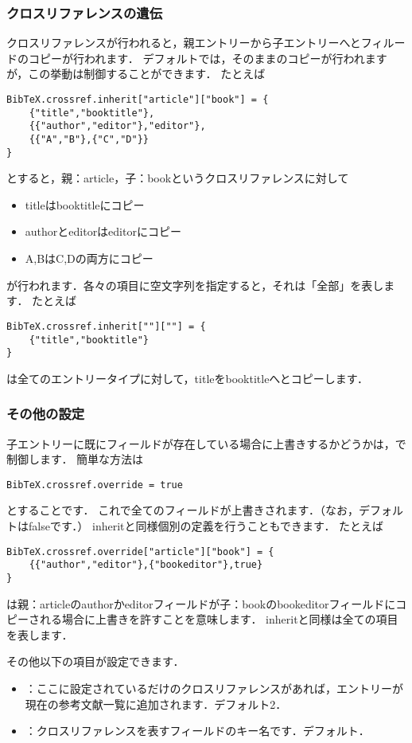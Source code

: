 \documentclass[a4paper]{ltjsarticle}
\begin{document}
\subsubsection{クロスリファレンスの遺伝}
クロスリファレンスが行われると，親エントリーから子エントリーへとフィルードのコピーが行われます．
デフォルトでは，そのままのコピーが行われますが，この挙動は制御することができます．
たとえば
\begin{lstlisting}
BibTeX.crossref.inherit["article"]["book"] = {
    {"title","booktitle"},
    {{"author","editor"},"editor"},
    {{"A","B"},{"C","D"}}
}
\end{lstlisting}
とすると，親：article，子：bookというクロスリファレンスに対して
\begin{itemize}
\item titleはbooktitleにコピー
\item authorとeditorはeditorにコピー
\item A,BはC,Dの両方にコピー
\end{itemize}
が行われます．各々の項目に空文字列\luastring{}を指定すると，それは「全部」を表します．
たとえば
\begin{lstlisting}
BibTeX.crossref.inherit[""][""] = {
    {"title","booktitle"}
}
\end{lstlisting}
は全てのエントリータイプに対して，titleをbooktitleへとコピーします．

\subsubsection{その他の設定}
子エントリーに既にフィールドが存在している場合に上書きするかどうかは，で制御します．
簡単な方法は
\begin{lstlisting}
BibTeX.crossref.override = true
\end{lstlisting}
とすることです．
これで全てのフィールドが上書きされます．（なお，デフォルトはfalseです．）
inheritと同様個別の定義を行うこともできます．
たとえば
\begin{lstlisting}
BibTeX.crossref.override["article"]["book"] = {
    {{"author","editor"},{"bookeditor"},true}
}
\end{lstlisting}
は親：articleのauthorかeditorフィールドが子：bookのbookeditorフィールドにコピーされる場合に上書きを許すことを意味します．
inheritと同様\luastring{}は全ての項目を表します．

その他以下の項目が設定できます．
\begin{itemize}
\item {}：ここに設定されているだけのクロスリファレンスがあれば，エントリーが現在の参考文献一覧に追加されます．デフォルト2．
\item {}：クロスリファレンスを表すフィールドのキー名です．デフォルト．
\end{itemize}
\end{document}
